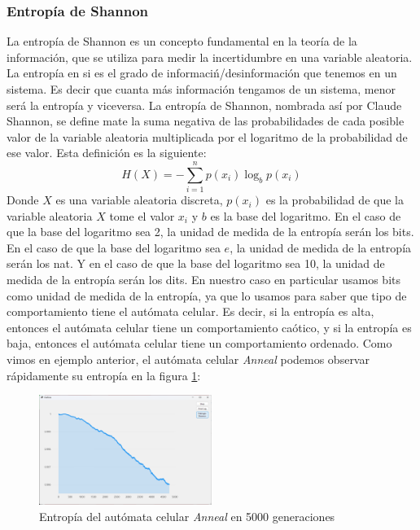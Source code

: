 \subsubsection{Entrop\'ia de Shannon}
\label{sec:Entriopia}
    La entrop\'ia de Shannon es un concepto fundamental en la teor\'ia de la informaci\'on, 
        que se utiliza para medir la incertidumbre en una variable aleatoria. La entrop\'ia en si 
        es el grado de informaci\'n/desinformaci\'on que tenemos en un sistema. Es decir que cuanta m\'as
        informaci\'on tengamos de un sistema, menor ser\'a la entrop\'ia y viceversa. La entrop\'ia de Shannon, 
        nombrada as\'i por Claude Shannon\cite{Shannon1948}, se define mate la suma negativa de las probabilidades de cada
        posible valor de la variable aleatoria multiplicada por el logaritmo de la probabilidad de ese valor. Esta
        definici\'on es la siguiente:
        \begin{equation}
            H(X) = -\sum_{i=1}^{n} p(x_i) \log_b p(x_i)
        \end{equation}
    \vskip 0.5cm
    Donde $X$ es una variable aleatoria discreta, $p(x_i)$ es la probabilidad de que la variable aleatoria 
        $X$ tome el valor $x_i$ y $b$ es la base del logaritmo. En el caso de que la base del logaritmo sea 2, 
        la unidad de medida de la entrop\'ia ser\'an los bits. En el caso de que la base del logaritmo sea $e$,
        la unidad de medida de la entrop\'ia ser\'an los nat. Y en el caso de que la base del logaritmo sea 10, 
        la unidad de medida de la entrop\'ia ser\'an los dits.
    \vskip 0.5cm
    En nuestro caso en particular usamos bits como unidad de medida de la entrop\'ia, ya que lo usamos para saber que tipo de comportamiento
        tiene el aut\'omata celular. Es decir, si la entrop\'ia es alta, entonces el aut\'omata celular tiene un comportamiento ca\'otico, y si 
        la entrop\'ia es baja, entonces el aut\'omata celular tiene un comportamiento ordenado.
    \vskip 0.5cm
    Como vimos en ejemplo anterior, el aut\'omata celular \textit{Anneal} podemos observar r\'apidamente su entrop\'ia
        en la figura \ref{fig:annealEntropia}: 
        \begin{figure}[h]
            \centering
            \includegraphics[width=0.5\textwidth]{./images/marco_teorico/automatas_celulares/Anneal5kShann.png}
            \caption{Entrop\'ia del aut\'omata celular \textit{Anneal} en 5000 generaciones}
            \label{fig:annealEntropia}  
        \end{figure}